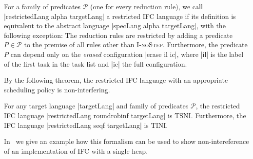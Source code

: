 



\begin{definition}
  \label{def:restricted}
  For a family of predicates $\mathcal P$ (one for every reduction
  rule), we call
  |restrictedLang alpha targetLang| a restricted IFC language
  if its definition is equivalent to the abstract language
  |specLang alpha targetLang|, with the following exception:
  The reduction rules are restricted
  by adding a predicate $P \in \mathcal P$ to the premise of
  all rules other than \textsc{I-noStep}.  Furthermore, the predicate $P$
  can depend only on the \textit{erased} configuration
  |erase il ic|, where |il| is the label of the first task
  in the task list and |ic| the full configuration.
\end{definition}

By the following theorem, the restricted IFC language with an
appropriate scheduling policy is non-interfering.

\begin{theorem}
  \label{thm:restricted}
  For any target language |targetLang| and family of predicates
  $\mathcal{P}$, the restricted IFC language |restrictedLang roundrobinf targetLang|
  is TSNI.  Furthermore, the IFC language
  |restrictedLang seqf targetLang| is TINI.
\end{theorem}

In~ we give an example how this formalism can be used
to show non-intereference of an implementation of IFC with a single heap.
